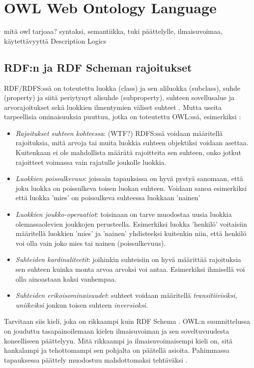\documentclass[finnish]{tktltiki2}
\theoremstyle{definition}
\theoremstyle{remark}
\begin{document}
\section{OWL Web Ontology Language}

mitä owl tarjoaa? syntaksi, semantiikka, tuki päättelylle, ilmaisuvoimaa,
käytettävyyttä
Description Logics
\subsection{RDF:n ja RDF Scheman rajoitukset}
RDF/RDFS:ssä on toteutettu luokka (class) ja sen aliluokka (subclass), suhde
(property) ja siitä periytynyt alisuhde (subproperty), suhteen sovellusalue ja
arvorajoitukset sekä luokkien ilmentymien väliset suhteet \cite{AH09}. Mutta
useita tarpeellisia ominaisuuksia puuttuu, jotka on toteutettu OWL:ssä,
esimerkiksi \cite{AH09}:
\begin{itemize}
 \item \textit{Rajoitukset suhteen kohteessa}: (WTF?) RDFS:ssä voidaan
määritellä rajoituksia, mitä arvoja tai muita luokkia suhteen objektiksi voidaan
asettaa. Kuitenkaan ei ole mahdollista määrätä rajoitteita sen suhteen, onko
jotkut rajoitteet voimassa vain rajatulle joukolle luokkia. 
 \item \textit{Luokkien poissulkevuus}: joissain tapauksissa on hyvä pystyä
sanomaan, että joku luokka on poissulkeva toisen luokan suhteen. Voidaan sanoa
esimerkiksi että luokka 'mies' on poissulkeva suhteessa luokkaan 'nainen'
 \item \textit{Luokkien joukko-operaatiot}: toisinaan on tarve muodostaa uusia
luokkia olemassaolevien joukkojen perusteella. Esimerkiksi luokka 'henkilö'
voitaisiin määritellä luokkien 'mies' ja 'nainen' yhdisteeksi kuitenkin niin,
että henkilö voi olla vain joko mies tai nainen (poissulkevuus).
 \item \textit{Suhteiden kardinaliteetit}: joihinkin suhteisiin on hyvä
määrittää rajoituksia sen suhteen kuinka monta arvoa arvoksi voi antaa.
Esimerkiksi ihmisellä voi olla ainoastaan kaksi vanhempaa.
 \item \textit{Suhteiden erikoisominaisuudet}: suhteet voidaan määritellä
\textit{transitiivisiksi, uniikeiksi} jonkun toisen suhteen
\textit{inversioksi}. 
\end{itemize}
Tarvitaan siis kieli, joka on rikkaampi kuin RDF Schema \cite{AH09}. OWL:n
suunnittelussa on jouduttu tasapainoilemaan kielen ilmaisuvoiman ja sen
soveltuvuudesta koneelliseen päättelyyn. Mitä rikkaampi ja ilmaisuvoimaisempi
kieli on, sitä hankalampi ja tehottomampi sen pohjalta on päätellä asioita.
Pahimmassa tapauksessa päättely muodostuu mahdottomaksi tehtäväksi \cite{AH09}. 
 
\end{document}
